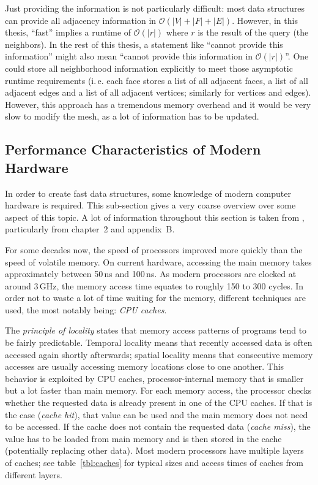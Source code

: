 Just providing the information is not particularly difficult:
most data structures can provide all adjacency information in $\mathcal O(|V| + |F| + |E|)$.
However, in this thesis, \enquote{fast} implies a runtime of $\mathcal O(|r|)$ where $r$ is the result of the query (the neighbors). In the rest of this thesis, a statement like \enquote{cannot provide this information} might also mean \enquote{cannot provide this information in $\mathcal O(|r|)$}.
One could store all neighborhood information explicitly to meet those asymptotic runtime requirements (i.\,e. each face stores a list of all adjacent faces, a list of all adjacent edges and a list of all adjacent vertices; similarly for vertices and edges).
However, this approach has a tremendous memory overhead and it would be very slow to modify the mesh, as a lot of information has to be updated.

\vfill
\subsection{Performance Characteristics of Modern Hardware}

In order to create fast data structures, some knowledge of modern computer hardware is required.
This sub-section gives a very coarse overview over some aspect of this topic.
A lot of information throughout this section is taken from \cite{hennessy2017computer}, particularly from chapter~2 and appendix~B.

For some decades now, the speed of processors improved more quickly than the speed of volatile memory.
On current hardware, accessing the main memory takes approximately between 50\,ns and 100\,ns.
As modern processors are clocked at around 3\,GHz, the memory access time equates to roughly 150 to 300 cycles.
In order not to waste a lot of time waiting for the memory, different techniques are used, the most notably being: \emph{CPU caches}.

The \emph{principle of locality} states that memory access patterns of programs tend to be fairly predictable.
Temporal locality means that recently accessed data is often accessed again shortly afterwards;
spatial locality means that consecutive memory accesses are usually accessing memory locations close to one another.
This behavior is exploited by CPU caches, processor-internal memory that is smaller but a lot faster than main memory.
For each memory access, the processor checks whether the requested data is already present in one of the CPU caches.
If that is the case (\emph{cache hit}), that value can be used and the main memory does not need to be accessed.
If the cache does not contain the requested data (\emph{cache miss}), the value has to be loaded from main memory and is then stored in the cache (potentially replacing other data).
Most modern processors have multiple layers of caches; see table~\ref{tbl:caches} for typical sizes and access times of caches from different layers.

